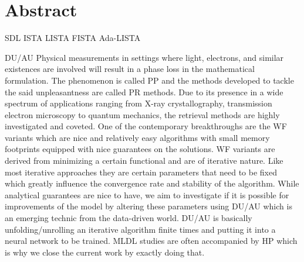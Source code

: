 \chapter*{Abstract}



\ac{SDL} \ac{ISTA} \ac{LISTA} \ac{FISTA} \ac{Ada-LISTA}

\ac{DU}/\ac{AU}
Physical measurements in settings where light, electrons, and similar existences are involved will result in a phase 
loss\cite{Shechtman2015} in the mathematical formulation. The phenomenon is called \ac{PP}\cite{Shechtman2015} 
and the methods developed to tackle the said unpleasantness are called 
\ac{PR}\cite{Jaganathan2015}\cite{Liu2019} methods. Due to its presence in a wide spectrum of 
applications\cite{Shechtman2015}\cite{Candes2014} ranging from X-ray crystallography, transmission electron microscopy 
to quantum mechanics, the retrieval methods are highly investigated and coveted\cite{Jaganathan2015}\cite{Liu2019}. 
One of the contemporary breakthroughs are the \ac{WF}\cite{Candes2014}\cite{Liu2019} variants which are nice and relatively easy algorithms 
with small memory footprints equipped with nice guarantees on the solutions. \ac{WF}\cite{Liu2019} variants are derived from minimizing a 
certain functional and are of iterative nature. Like most iterative approaches they are certain parameters that need to be fixed which 
greatly influence the convergence rate and stability of the algorithm. While analytical guarantees are nice to have, we aim 
to investigate if it is possible for improvements of the model by altering these parameters using \ac{DU}/\ac{AU}\cite{Monga2019} 
which is an emerging technic from the data-driven world. \ac{DU}/\ac{AU} is basically unfolding/unrolling an 
iterative algorithm finite times and putting it into a neural network to be trained. \ac{ML}\ac{DL} studies are often accompanied 
by \ac{HP} which is why we close the current work by exactly doing that.   
\endinput